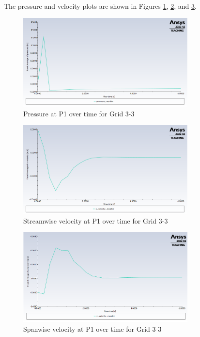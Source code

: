 The pressure and velocity plots are shown in Figures \ref{fig:pressure plot grid 3 3}, \ref{fig:x-velocity plot grid 3 3}, and \ref{fig:y-velocity plot grid 3 3}.
\begin{figure}[H]
    \centering
    \includegraphics[width=0.8\textwidth]{Questions/Figures/pressure plot grid 3 3.png}
    \caption{Pressure at P1 over time for Grid 3-3}
    \label{fig:pressure plot grid 3 3}
\end{figure}
\begin{figure}[H]
    \centering
    \includegraphics[width=0.8\textwidth]{Questions/Figures/x-velocity plot grid 3 3.png}
    \caption{Streamwise velocity at P1 over time for Grid 3-3}
    \label{fig:x-velocity plot grid 3 3}
\end{figure}
\begin{figure}[H]
    \centering
    \includegraphics[width=0.8\textwidth]{Questions/Figures/y-velocity plot grid 3 3.png}
    \caption{Spanwise velocity at P1 over time for Grid 3-3}
    \label{fig:y-velocity plot grid 3 3}
\end{figure}


